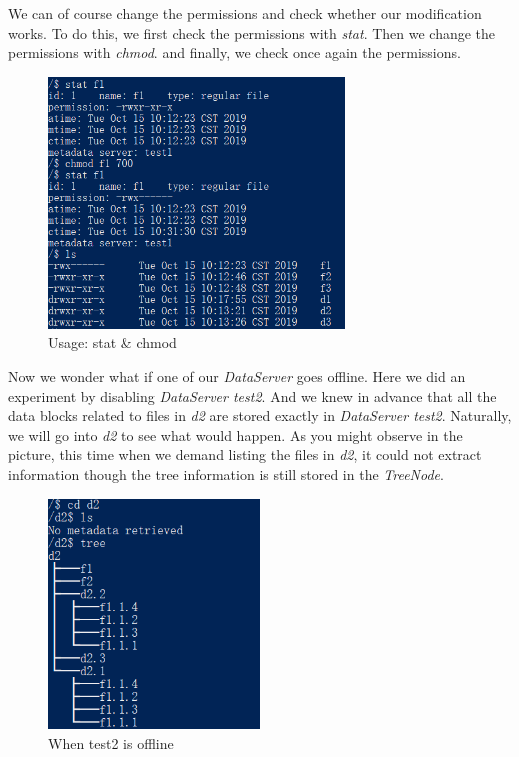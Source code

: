 \documentclass[10pt]{article}
\begin{document}
We can of course change the permissions and check whether our modification works. To do this, 
we first check the permissions with \textit{stat}. Then we change the permissions with \textit{chmod}. 
and finally, we check once again the permissions.

\begin{figure}[H]
\centerline{\includegraphics[width = 0.7\textwidth]{images//6 stat and chmod.png}}
\caption{Usage: stat \& chmod}
\end{figure}

Now we wonder what if one of our \textit{DataServer} goes offline. Here we did an experiment by disabling \textit{DataServer test2}. 
And we knew in advance that all the data blocks related to files in \textit{d2} are stored exactly in \textit{DataServer test2}. 
Naturally, we will go into \textit{d2} to see what would happen. As you might observe in the picture, this time when we demand 
listing the files in \textit{d2}, it could not extract information though the tree information is still stored in the \textit{TreeNode}.

\begin{figure}[H]
\centerline{\includegraphics[width = 0.5\textwidth]{images//7 when test2 is offline.png}}
\caption{When test2 is offline}
\end{figure}
\end{document}
